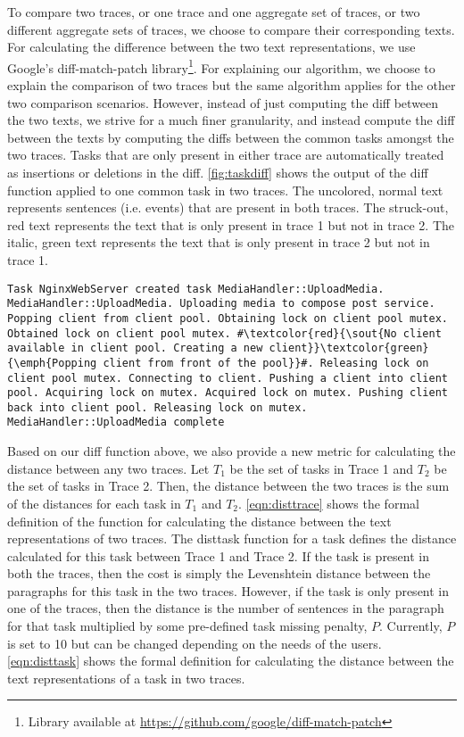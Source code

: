 To compare two traces, or one trace and one aggregate set of traces, or two different aggregate sets of traces, we choose to compare their corresponding texts. For calculating the difference
between the two text representations, we use Google's diff-match-patch library\footnote{Library available at \url{https://github.com/google/diff-match-patch}}. For explaining our algorithm, we choose to explain the comparison
of two traces but the same algorithm applies for the other two comparison scenarios.
However, instead of just computing the diff between the two texts, we strive for a much finer granularity, and instead
compute the diff between the texts by computing the diffs between the common tasks amongst the two traces.
Tasks that are only present in either trace are automatically treated as insertions or deletions in the diff.
\autoref{fig:taskdiff} shows the output of the diff function applied to one common task in two traces.
The uncolored, normal text represents sentences (i.e. events) that are present in both traces. The struck-out,
red text represents the text that is only present in trace 1 but not in trace 2. The italic, green text represents
the text that is only present in trace 2 but not in trace 1.

\begin{lstlisting}[caption={Text Difference for a task from 2 traces},captionpos=b,label={fig:taskdiff}, escapechar=\#]
    Task NginxWebServer created task MediaHandler::UploadMedia. MediaHandler::UploadMedia. Uploading media to compose post service. Popping client from client pool. Obtaining lock on client pool mutex. Obtained lock on client pool mutex. #\textcolor{red}{\sout{No client available in client pool. Creating a new client}}\textcolor{green}{\emph{Popping client from front of the pool}}#. Releasing lock on client pool mutex. Connecting to client. Pushing a client into client pool. Acquiring lock on mutex. Acquired lock on mutex. Pushing client back into client pool. Releasing lock on mutex. MediaHandler::UploadMedia complete
\end{lstlisting}

 Based on our diff function above, we also provide a new metric for calculating
the distance between any two traces. Let $T_1$ be the set of tasks in Trace 1 and $T_2$ be the set
of tasks in Trace 2. Then, the distance between the two traces is the sum of the distances for each task
in $T_1$ and $T_2$. \autoref{eqn:disttrace} shows the formal definition of the function for calculating
the distance between the text representations of two traces.
The disttask function for a task defines the distance calculated for this task between Trace 1 and Trace 2.
If the task is present in both the traces, then the cost is simply the Levenshtein distance between the paragraphs
for this task in the two traces. However, if the task is only present in one of the traces, then the distance is
the number of sentences in the paragraph for that task multiplied by some pre-defined task missing penalty, $P$.
Currently, $P$ is set to 10 but can be changed depending on the needs of the users. \autoref{eqn:disttask}
shows the formal definition for calculating the distance between the text representations of a task in two traces.
